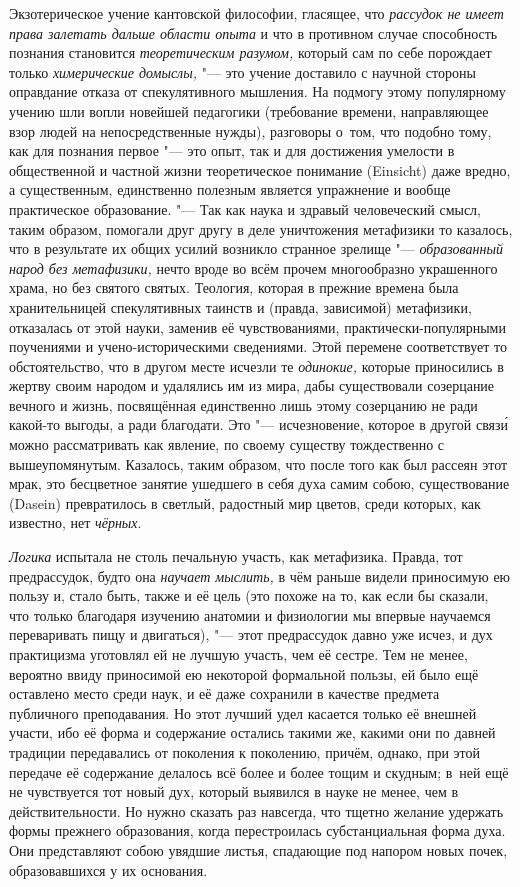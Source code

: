 \label{kantezoter}Экзотерическое учение кантовской философии, гласящее,
что {\em рассудок не имеет права залетать дальше области опыта} и что в
противном случае способность познания становится {\em теоретическим разумом,}
который сам по себе порождает только {\em химерические домыслы,} "--- это
учение доставило с научной стороны оправдание отказа от спекулятивного
мышления. На подмогу этому популярному учению шли вопли новейшей педагогики
(требование времени, направляющее взор людей на непосредственные нужды),
разговоры о~том, что подобно тому, как для познания первое "--- это опыт,
так и для достижения умелости в общественной и частной жизни теоретическое
понимание (Einsicht) даже вредно, а существенным, единственно полезным
является упражнение и вообще практическое образование. "--- Так как наука и здравый
человеческий смысл, таким образом, помогали друг другу в деле уничтожения метафизики
то казалось, что в результате их общих усилий возникло странное зрелище "---
{\em образованный народ без метафизики,} нечто вроде во всём прочем
многообразно украшенного храма, но без святого святых. Теология, которая в
прежние времена была хранительницей спекулятивных таинств и (правда, зависимой)
метафизики, отказалась от этой науки, заменив её чувствованиями,
практически-популярными поучениями и учено-историческими сведениями. Этой
перемене соответствует то обстоятельство, что в другом месте исчезли те
{\em одинокие,} которые приносились в жертву своим народом и удалялись им из
мира, дабы существовали созерцание вечного и жизнь, посвящённая единственно
лишь этому созерцанию не ради какой-то выгоды, а ради благодати. Это "--- исчезновение,
которое в другой связ\'{и} можно рассматривать как явление, по
своему существу тождественно с вышеупомянутым. Казалось, таким образом, что после
того как был рассеян этот мрак, это бесцветное занятие ушедшего в себя духа самим
собою, существование (Dasein) превратилось в светлый, радостный мир цветов, среди
которых, как известно, нет {\em чёрных}.

{\em Логика} испытала не столь печальную участь, как метафизика. Правда, тот
предрассудок, будто она {\em научает мыслить,} в чём раньше видели приносимую
ею пользу и, стало быть, также и её цель (это похоже на то, как если бы
сказали, что только благодаря изучению анатомии и физиологии мы впервые
научаемся переваривать пищу и двигаться), "--- этот предрассудок давно уже
исчез, и дух практицизма уготовлял ей не лучшую участь, чем её сестре. Тем не
менее, вероятно ввиду приносимой ею некоторой формальной пользы, ей было ещё
оставлено место среди наук, и её даже сохранили в качестве предмета публичного
преподавания. Но этот лучший удел касается только её внешней участи, ибо её
форма и содержание остались такими же, какими они по давней традиции
передавались от поколения к поколению, причём, однако, при этой передаче
её содержание делалось всё более и более тощим и скудным; в~ней ещё не
чувствуется тот новый дух, который выявился в науке не менее, чем в
действительности. Но нужно сказать раз навсегда, что тщетно желание удержать
формы прежнего образования, когда перестроилась субстанциальная форма духа. Они
представляют собою увядшие листья, спадающие под напором новых почек,
образовавшихся у их основания.


